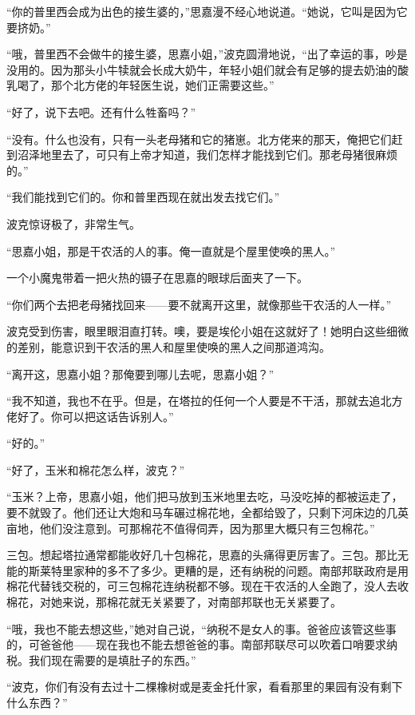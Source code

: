 \par “你的普里西会成为出色的接生婆的，”思嘉漫不经心地说道。“她说，它叫是因为它要挤奶。”
\par “哦，普里西不会做牛的接生婆，思嘉小姐，”波克圆滑地说，“出了幸运的事，吵是没用的。因为那头小牛犊就会长成大奶牛，年轻小姐们就会有足够的提去奶油的酸乳喝了，那个北方佬的年轻医生说，她们正需要这些。”
\par “好了，说下去吧。还有什么牲畜吗？”
\par “没有。什么也没有，只有一头老母猪和它的猪崽。北方佬来的那天，俺把它们赶到沼泽地里去了，可只有上帝才知道，我们怎样才能找到它们。那老母猪很麻烦的。”
\par “我们能找到它们的。你和普里西现在就出发去找它们。”
\par 波克惊讶极了，非常生气。
\par “思嘉小姐，那是干农活的人的事。俺一直就是个屋里使唤的黑人。”
\par 一个小魔鬼带着一把火热的镊子在思嘉的眼球后面夹了一下。
\par “你们两个去把老母猪找回来——要不就离开这里，就像那些干农活的人一样。”
\par 波克受到伤害，眼里眼泪直打转。噢，要是埃伦小姐在这就好了！她明白这些细微的差别，能意识到干农活的黑人和屋里使唤的黑人之间那道鸿沟。
\par “离开这，思嘉小姐？那俺要到哪儿去呢，思嘉小姐？”
\par “我不知道，我也不在乎。但是，在塔拉的任何一个人要是不干活，那就去追北方佬好了。你可以把这话告诉别人。”
\par “好的。”
\par “好了，玉米和棉花怎么样，波克？”
\par “玉米？上帝，思嘉小姐，他们把马放到玉米地里去吃，马没吃掉的都被运走了，要不就毁了。他们还让大炮和马车碾过棉花地，全都给毁了，只剩下河床边的几英亩地，他们没注意到。可那棉花不值得伺弄，因为那里大概只有三包棉花。”
\par 三包。想起塔拉通常都能收好几十包棉花，思嘉的头痛得更厉害了。三包。那比无能的斯莱特里家种的多不了多少。更糟的是，还有纳税的问题。南部邦联政府是用棉花代替钱交税的，可三包棉花连纳税都不够。现在干农活的人全跑了，没人去收棉花，对她来说，那棉花就无关紧要了，对南部邦联也无关紧要了。
\par “哦，我也不能去想这些，”她对自己说，“纳税不是女人的事。爸爸应该管这些事的，可爸爸他——现在我也不能去想爸爸的事。南部邦联尽可以吹着口哨要求纳税。我们现在需要的是填肚子的东西。”
\par “波克，你们有没有去过十二棵橡树或是麦金托什家，看看那里的果园有没有剩下什么东西？”

